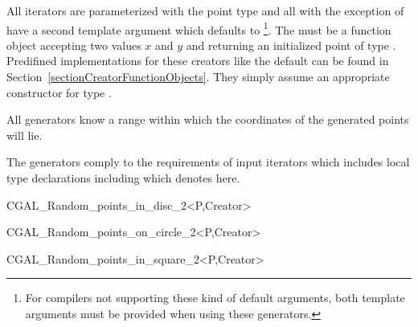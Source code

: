 All iterators are parameterized with the point type  and all
with the exception of  have a second
template argument  which defaults to
\footnote{%
  For compilers not supporting these kind of default arguments, both
  template arguments must be provided when using these generators.}.
The  must be a function object accepting two 
values $x$ and $y$ and returning an initialized point  of type
. Predifined implementations for these creators like the
default can be found in Section~\ref{sectionCreatorFunctionObjects}.
They simply assume an appropriate constructor for type .

All generators know a range within which the coordinates of the
generated points will lie.


\ccTypes

The generators comply to the requirements of input iterators which
includes local type declarations including  which
denotes  here.

\ccCreation


\ccHtmlNoClassFile
\begin{ccClassTemplate}{CGAL_Random_points_in_disc_2<P,Creator>}
\end{ccClassTemplate}

\ccHtmlNoClassFile
\begin{ccClassTemplate}{CGAL_Random_points_on_circle_2<P,Creator>}
\end{ccClassTemplate}

\ccHtmlNoClassFile
\begin{ccClassTemplate}{CGAL_Random_points_in_square_2<P,Creator>}
\end{ccClassTemplate}

